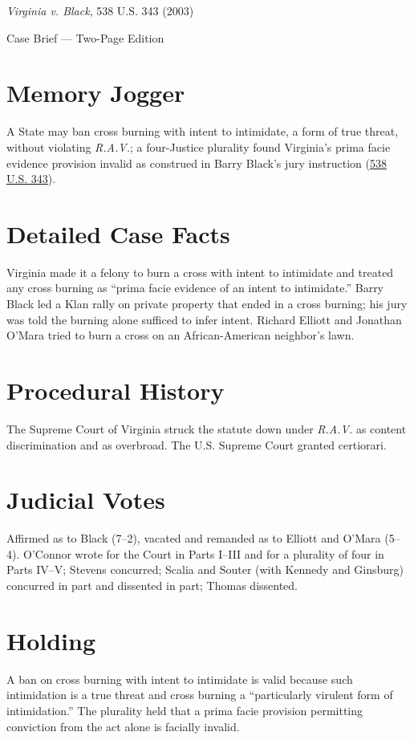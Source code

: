 \documentclass[12pt]{article}
\begin{document}
\begin{center}
{\LARGE \textit{Virginia v. Black}, 538 U.S. 343 (2003)\par}
\vspace{0.5em}
{\large Case Brief --- Two-Page Edition\par}
\end{center}

\section{Memory Jogger}
A State may ban cross burning with intent to intimidate, a form of true threat, without violating \textit{R.A.V.}; a four-Justice plurality found Virginia's prima facie evidence provision invalid as construed in Barry Black's jury instruction (\href{https://supreme.justia.com/cases/federal/us/538/343/}{538 U.S. 343}).

\section{Detailed Case Facts}
Virginia made it a felony to burn a cross with intent to intimidate and treated any cross burning as ``prima facie evidence of an intent to intimidate.'' Barry Black led a Klan rally on private property that ended in a cross burning; his jury was told the burning alone sufficed to infer intent. Richard Elliott and Jonathan O'Mara tried to burn a cross on an African-American neighbor's lawn.

\section{Procedural History}
The Supreme Court of Virginia struck the statute down under \textit{R.A.V.} as content discrimination and as overbroad. The U.S. Supreme Court granted certiorari.

\section{Judicial Votes}
Affirmed as to Black (7--2), vacated and remanded as to Elliott and O'Mara (5--4). O'Connor wrote for the Court in Parts I--III and for a plurality of four in Parts IV--V; Stevens concurred; Scalia and Souter (with Kennedy and Ginsburg) concurred in part and dissented in part; Thomas dissented.

\section{Holding}
A ban on cross burning with intent to intimidate is valid because such intimidation is a true threat and cross burning a ``particularly virulent form of intimidation.'' The plurality held that a prima facie provision permitting conviction from the act alone is facially invalid.
\end{document}
